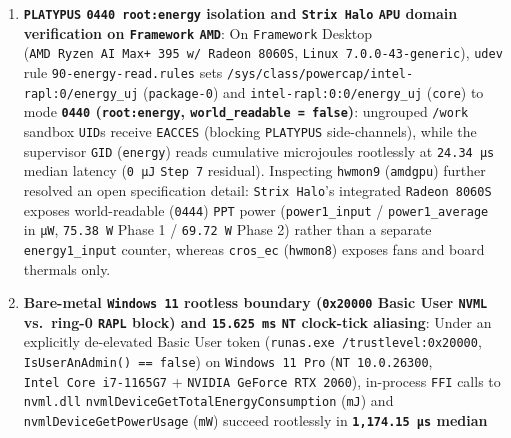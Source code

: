 \documentclass[10pt,letterpaper]{article}
\providecommand{\tightlist}{\setlength{\itemsep}{1pt}\setlength{\parskip}{0pt}}
\begin{document}
\begin{enumerate}
\def\labelenumi{\arabic{enumi}.}
\setcounter{enumi}{2}
\tightlist
\item
  \textbf{\texttt{PLATYPUS} \texttt{0440\ root:energy} isolation and
  \texttt{Strix\ Halo} \texttt{APU} domain verification on
  \texttt{Framework} \texttt{AMD}}: On \texttt{Framework} Desktop
  (\texttt{AMD\ Ryzen\ AI\ Max+\ 395\ w/\allowbreak{}\ Radeon\ 8060S},
  \texttt{Linux\ 7.\allowbreak{}0.\allowbreak{}0-\allowbreak{}43-\allowbreak{}generic}), \texttt{udev} rule
  \texttt{90-\allowbreak{}energy-\allowbreak{}read.\allowbreak{}rules} sets
  \texttt{/\allowbreak{}sys/\allowbreak{}class/\allowbreak{}powercap/\allowbreak{}intel-\allowbreak{}rapl:0/\allowbreak{}energy\_\allowbreak{}uj}
  (\texttt{package-0}) and \texttt{intel-\allowbreak{}rapl:0:0/\allowbreak{}energy\_\allowbreak{}uj}
  (\texttt{core}) to mode \textbf{\texttt{0440} (\texttt{root:energy},
  \texttt{world\_\allowbreak{}readable\ =\ false})}: ungrouped \texttt{/work} sandbox
  \texttt{UID}s receive \texttt{EACCES} (blocking \texttt{PLATYPUS}
  side-channels), while the supervisor \texttt{GID} (\texttt{energy})
  reads cumulative microjoules rootlessly at \texttt{24.34\ µs} median
  latency (\texttt{0\ µJ} \texttt{Step\ 7} residual). Inspecting
  \texttt{hwmon9} (\texttt{amdgpu}) further resolved an open
  specification detail: \texttt{Strix\ Halo}'s integrated
  \texttt{Radeon\ 8060S} exposes world-readable (\texttt{0444})
  \texttt{PPT} power (\texttt{power1\_\allowbreak{}input} / \texttt{power1\_\allowbreak{}average}
  in \texttt{µW}, \texttt{75.38\ W} Phase 1 / \texttt{69.72\ W} Phase 2)
  rather than a separate \texttt{energy1\_\allowbreak{}input} counter, whereas
  \texttt{cros\_ec} (\texttt{hwmon8}) exposes fans and board thermals
  only.
\item
  \textbf{Bare-metal \texttt{Windows\ 11} rootless boundary
  (\texttt{0x20000} Basic User \texttt{NVML} vs.~ring-0 \texttt{RAPL}
  block) and \texttt{15.\allowbreak{}625\ ms} \texttt{NT} clock-tick aliasing}: Under
  an explicitly de-elevated Basic User token
  (\texttt{runas.\allowbreak{}exe\ /\allowbreak{}trustlevel:0x20000},
  \texttt{IsUserAnAdmin(\allowbreak{})\ ==\ false}) on \texttt{Windows\ 11\ Pro}
  (\texttt{NT\ 10.\allowbreak{}0.\allowbreak{}26300}, \texttt{Intel\ Core\ i7-\allowbreak{}1165G7} +
  \texttt{NVIDIA\ GeForce\ RTX\ 2060}), in-process \texttt{FFI} calls to
  \texttt{nvml.dll} \texttt{nvmlDeviceGetTotalEnergyConsumption}
  (\texttt{mJ}) and \texttt{nvmlDeviceGetPowerUsage} (\texttt{mW})
  succeed rootlessly in \textbf{\texttt{1,\allowbreak{}174.\allowbreak{}15\ µs} median}

\end{enumerate}
\end{document}
